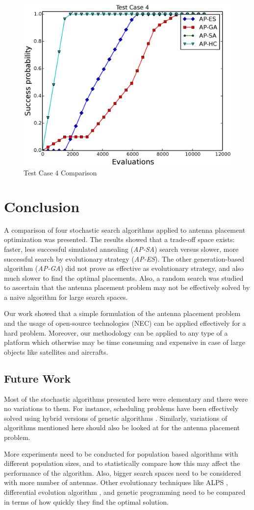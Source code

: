 \documentclass{sig-alternate}
\begin{document}
\begin{figure}
    \begin{center}
        \includegraphics[width=.49\textwidth]{FIG/tc4_sp.eps}
\end{center}
\caption{Test Case 4 Comparison}
\label{fig:tc4}
\end{figure}


\section{Conclusion}
\label{sec-conclusion}
A comparison of four stochastic search algorithms applied to antenna placement optimization was presented. The results showed that a trade-off space exists: faster, less successful simulated annealing (\textit{AP-SA}) search versus slower, more successful search by evolutionary strategy (\textit{AP-ES}). The other generation-based algorithm (\textit{AP-GA}) did not prove as effective as evolutionary strategy, and also much slower to find the optimal placements. Also, a random search was studied to ascertain that the antenna placement problem may not be effectively solved by a naive algorithm for large search spaces.

Our work showed that a simple formulation of the antenna placement problem and the usage of open-source technologies (NEC) can be applied effectively for a hard problem. Moreover, our methodology can be applied to any type of a platform which otherwise may be time consuming and expensive in case of large objects like satellites and aircrafts. 
\subsection{Future Work}
Most of the stochastic algorithms presented here were elementary and there were no variations to them. For instance, scheduling problems have been effectively solved using hybrid versions of genetic algorithms \cite{valls2008hybrid}. Similarly, variations of algorithms mentioned here should also be looked at for the antenna placement problem. 

More experiments need to be conducted for population based algorithms with different population sizes, and to statistically compare how this may affect the performance of the algorithm. Also, bigger search spaces need to be considered with more number of antennas. Other evolutionary techniques like ALPS \cite{hornby2006alps}, differential evolution algorithm \cite{pan2008discrete}, and genetic programming \cite{banzhaf1997genetic} need to be compared in terms of how quickly they find the optimal solution. 


 
\end{document}
